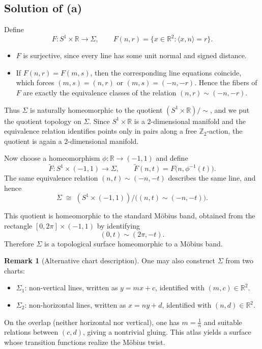 \documentclass[12pt,a4paper]{article}
\theoremstyle{plain}
\theoremstyle{definition}      %
\newtheorem{remark}[theorem]{Remark}
\begin{document}
	\subsection*{Solution of (a)}
	
	Define
	\[
	F : S^1\times\mathbb{R} \longrightarrow \Sigma,
	\qquad
	F(n,r) = \{x\in\mathbb{R}^2 : \langle x,n\rangle = r\}.
	\]
	
	\begin{itemize}
		\item $F$ is surjective, since every line has some unit normal and signed distance.
		\item If $F(n,r) = F(m,s)$, then the corresponding line equations coincide,
		which forces $(m,s)=(n,r)$ or $(m,s)=(-n,-r)$.  Hence the fibers of $F$
		are exactly the equivalence classes of the relation $(n,r)\sim(-n,-r)$.
	\end{itemize}
	
	Thus $\Sigma$ is naturally homeomorphic to the quotient
	$(S^1\times\mathbb{R})/\!\sim$, and we put the quotient topology on $\Sigma$.
	Since $S^1\times\mathbb{R}$ is a $2$-dimensional manifold and the equivalence
	relation identifies points only in pairs along a free $\mathbb{Z}_2$-action,
	the quotient is again a $2$-dimensional manifold.
	
	Now choose a homeomorphism $\phi:\mathbb{R}\to(-1,1)$ and define
	\[
	\widetilde{F}:S^1\times(-1,1)\longrightarrow \Sigma,\qquad
	\widetilde{F}(n,t)=F\bigl(n,\phi^{-1}(t)\bigr).
	\]
	The same equivalence relation $(n,t)\sim(-n,-t)$ describes the same line,
	and hence
	\[
	\Sigma \;\cong\; (S^1\times(-1,1))/\bigl((n,t)\sim(-n,-t)\bigr).
	\]
	
	This quotient is homeomorphic to the standard M\"obius band, obtained
	from the rectangle $[0,2\pi]\times(-1,1)$ by identifying
	\[
	(0,t)\sim(2\pi,-t).
	\]
	Therefore $\Sigma$ is a topological surface homeomorphic to a M\"obius band.
	
	\begin{remark}[Alternative chart description]
		One may also construct $\Sigma$ from two charts:
		\begin{itemize}
			\item $\Sigma_1$: non-vertical lines, written as $y = mx + c$,
			identified with $(m,c)\in\mathbb{R}^2$.
			\item $\Sigma_2$: non-horizontal lines, written as $x = ny + d$,
			identified with $(n,d)\in\mathbb{R}^2$.
		\end{itemize}
		On the overlap (neither horizontal nor vertical), one has $m=\frac{1}{n}$
		and suitable relations between $(c,d)$, giving a nontrivial gluing.
		This atlas yields a surface whose transition functions realize the
		M\"obius twist.
	\end{remark}
	
\end{document}
